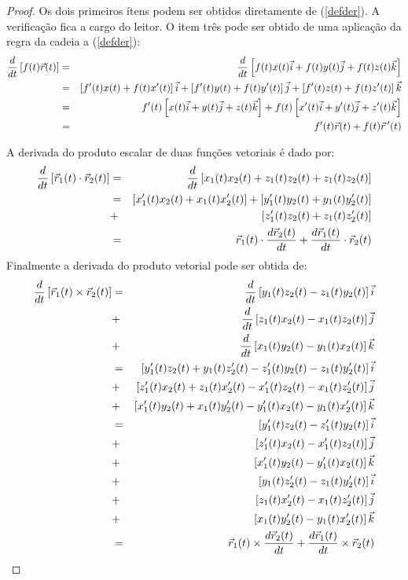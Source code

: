 \begin{proof} Os dois primeiros ítens podem ser obtidos diretamente de (\ref{defder}). A verificação fica a cargo do leitor. O item três pode ser obtido de  uma aplicação da regra da cadeia a (\ref{defder}):
\begin{eqnarray*}\frac{d}{dt}\left[f(t) \vec{r}(t)\right]&=& \frac{d}{dt}\left[f(t) {x}(t)\vec{i}+f(t) {y}(t)\vec{j}+f(t) {z}(t)\vec{k}\right]\\
&=&\left[f'(t) x(t)+f(t)x'(t)\right]\vec{i}+\left[f'(t) y(t)+f(t)y'(t)\right]\vec{j}+\left[f'(t) z(t)+f(t)z'(t)\right]\vec{k}\\
&=&f'(t)\left[x(t)\vec{i}+y(t)\vec{j}+z(t)\vec{k}\right]+f(t)\left[x'(t)\vec{i}+y'(t)\vec{j}+z'(t)\vec{k}\right]\\
&=&f'(t)\vec{r}(t)+f(t)\vec{r}\!~'(t)
\end{eqnarray*}

A derivada do produto escalar de duas funções vetoriais é dado por:
\begin{eqnarray*}\frac{d}{dt}\left[\vec{r}_1(t)\cdot \vec{r}_2(t)\right]&=&\frac{d}{dt}\left[x_1(t)x_2(t)+z_1(t)z_2(t)+z_1(t)z_2(t)\right]\\
&=&
\left[x_1'(t)x_2(t)+x_1(t)x_2'(t)\right]+\left[y_1'(t)y_2(t)+y_1(t)y_2'(t)\right]
\\&+&\left[z_1'(t)z_2(t)+z_1(t)z_2'(t)\right]\\&=&\vec{r}_1(t)\cdot\frac{d\vec{r}_2(t)}{dt}+\frac{d\vec{r}_1(t)}{dt}\cdot\vec{r}_2(t)
\end{eqnarray*}
Finalmente a derivada do produto vetorial pode ser obtida de:
{\allowdisplaybreaks
\begin{eqnarray*}
\frac{d}{dt}\left[\vec{r}_1(t)\times \vec{r}_2(t)\right]&=&\frac{d}{dt}\left[y_1(t) z_2(t)-z_1(t)y_2(t)\right]\vec{i}\\
&+&\frac{d}{dt}\left[z_1(t) x_2(t)-x_1(t)z_2(t)\right]\vec{j}\\
&+&\frac{d}{dt}\left[x_1(t) y_2(t)-y_1(t)x_2(t)\right]\vec{k}\\
&=&\left[y_1'(t) z_2(t)+y_1(t) z_2'(t)-z_1'(t)y_2(t)-z_1(t)y_2'(t)\right]\vec{i}\\
&+&\left[z_1'(t) x_2(t)+z_1(t) x_2'(t)-x_1'(t)z_2(t)-x_1(t)z_2'(t)\right]\vec{j}\\
&+&\left[x_1'(t) y_2(t)+x_1(t) y_2'(t)-y_1'(t)x_2(t)-y_1(t)x_2'(t)\right]\vec{k}\\
&=&\left[y_1'(t) z_2(t)-z_1'(t)y_2(t)\right]\vec{i}\\
&+&\left[z_1'(t) x_2(t)-x_1'(t)z_2(t)\right]\vec{j}\\
&+&\left[x_1'(t) y_2(t)-y_1'(t)x_2(t)\right]\vec{k}\\
&+&\left[y_1(t) z_2'(t)-z_1(t)y_2'(t)\right]\vec{i}\\
&+&\left[z_1(t) x_2'(t)-x_1(t)z_2'(t)\right]\vec{j}\\
&+&\left[x_1(t) y_2'(t)-y_1(t)x_2'(t)\right]\vec{k}\\
&=&\vec{r}_1(t)\times\frac{d\vec{r}_2(t)}{dt}+\frac{d\vec{r}_1(t)}{dt}\times\vec{r}_2(t)
\end{eqnarray*}
}
\end{proof}
